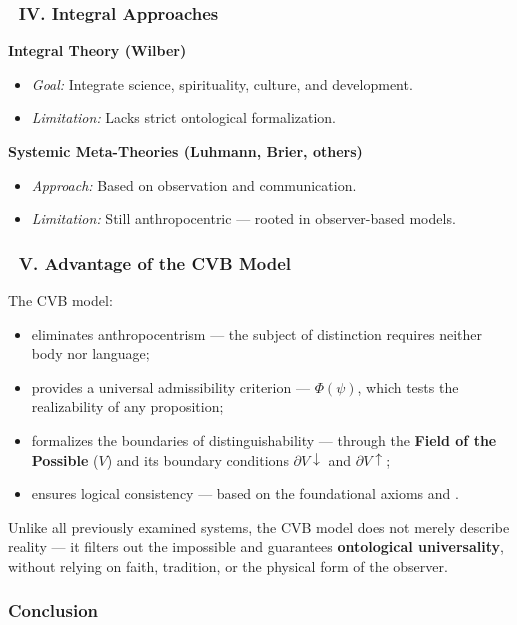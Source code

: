 \documentclass[12pt]{article}
\begin{document}
\subsubsection*{🔹 IV. Integral Approaches}

\textbf{Integral Theory (Wilber)}

\begin{itemize}
\item \textit{Goal:} Integrate science, spirituality, culture, and development.
\item \textit{Limitation:} Lacks strict ontological formalization.
\end{itemize}

\textbf{Systemic Meta-Theories (Luhmann, Brier, others)}

\begin{itemize}
\item \textit{Approach:} Based on observation and communication.
\item \textit{Limitation:} Still anthropocentric — rooted in observer-based models.
\end{itemize}

\subsubsection*{🔹 V. Advantage of the CVB Model}

The CVB model:

\begin{itemize}
\item eliminates anthropocentrism — the subject of distinction requires neither body nor language;
\item provides a universal admissibility criterion — $\Phi(\psi)$, which tests the realizability of any proposition;
\item formalizes the boundaries of distinguishability — through the \textbf{Field of the Possible} ($V$) and its boundary conditions $\partial V\downarrow$ and $\partial V\uparrow$;
\item ensures logical consistency — based on the foundational axioms \text{[1]} and \text{[2]}.
\end{itemize}

Unlike all previously examined systems, the CVB model does not merely describe reality — it filters out the impossible and guarantees \textbf{ontological universality}, without relying on faith, tradition, or the physical form of the observer.

\subsubsection*{Conclusion}
\end{document}
